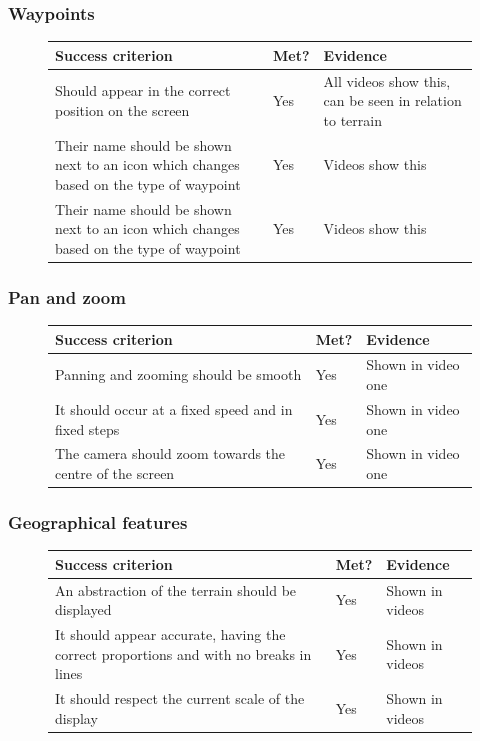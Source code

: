 \documentclass{article}
\begin{document}
\subsubsection{Waypoints}
\begin{figure}[H]
\centering
\begin{tabular}{| p{} | p{} | p{} |}
\hline
\textbf{Success criterion} & \textbf{Met?} & \textbf{Evidence} \\
\hline
Should appear in the correct position on the screen & Yes & All videos show this, can be seen in relation to terrain \\
\hline
Their name should be shown next to an icon which changes based on the type of waypoint & Yes & Videos show this \\
\hline
Their name should be shown next to an icon which changes based on the type of waypoint & Yes & Videos show this \\
\hline
\end{tabular}
\end{figure}

\subsubsection{Pan and zoom}
\begin{figure}[H]
\centering
\begin{tabular}{| p{} | p{} | p{} |}
\hline
\textbf{Success criterion} & \textbf{Met?} & \textbf{Evidence} \\
\hline
Panning and zooming should be smooth & Yes & Shown in video one \\
\hline
It should occur at a fixed speed and in fixed steps & Yes & Shown in video one \\
\hline
The camera should zoom towards the centre of the screen & Yes & Shown in video one \\
\hline
\end{tabular}
\end{figure}

\subsubsection{Geographical features}
\begin{figure}[H]
\centering
\begin{tabular}{| p{} | p{} | p{} |}
\hline
\textbf{Success criterion} & \textbf{Met?} & \textbf{Evidence} \\
\hline
An abstraction of the terrain should be displayed & Yes & Shown in videos \\
\hline
It should appear accurate, having the correct proportions and with no breaks in lines & Yes & Shown in videos \\
\hline
It should respect the current scale of the display & Yes & Shown in videos \\
\hline
\end{tabular}
\end{figure}
\end{document}
